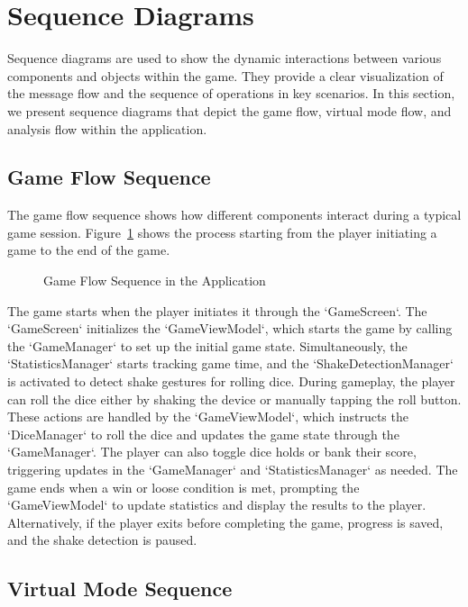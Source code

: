 \section{Sequence Diagrams}

Sequence diagrams are used to show the dynamic interactions between various components and objects within the game. They provide a clear visualization of the message flow and the sequence of operations in key scenarios. In this section, we present sequence diagrams that depict the game flow, virtual mode flow, and analysis flow within the application.

\subsection{Game Flow Sequence}

The game flow sequence shows how different components interact during a typical game session. Figure~\ref{fig:game_flow} shows the process starting from the player initiating a game to the end of the game.

\begin{figure}[ht!]
    \centering
    
    \caption{Game Flow Sequence in the Application}
    \label{fig:game_flow}
\end{figure}

The game starts when the player initiates it through the `GameScreen`. The `GameScreen` initializes the `GameViewModel`, which starts the game by calling the `GameManager` to set up the initial game state. Simultaneously, the `StatisticsManager` starts tracking game time, and the `ShakeDetectionManager` is activated to detect shake gestures for rolling dice. During gameplay, the player can roll the dice either by shaking the device or manually tapping the roll button. These actions are handled by the `GameViewModel`, which instructs the `DiceManager` to roll the dice and updates the game state through the `GameManager`. The player can also toggle dice holds or bank their score, triggering updates in the `GameManager` and `StatisticsManager` as needed. The game ends when a win or loose condition is met, prompting the `GameViewModel` to update statistics and display the results to the player. Alternatively, if the player exits before completing the game, progress is saved, and the shake detection is paused.

\subsection{Virtual Mode Sequence}

